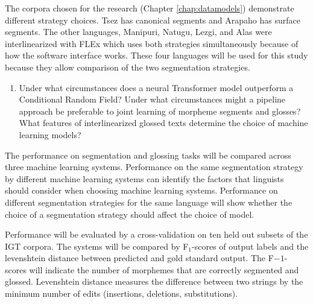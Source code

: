 
The corpora chosen for the research (Chapter \ref{chap:datamodels}) demonstrate different strategy choices.  Tsez has canonical segments and Arapaho has surface segments. The other languages, Manipuri, Natugu, Lezgi, and Alas were interlinearized with FLEx which uses both strategies simultaneously because of how the software interface works. These four languages will be used for this study because they allow comparison of the two segmentation strategies. 

\begin{enumerate}[resume]
    \item Under what circumstances does a neural Transformer model outperform a Conditional Random Field? Under what circumstances might a pipeline approach be preferable to joint learning of morpheme segments and glosses? What features of interlinearized glossed texts determine the choice of machine learning models?
\end{enumerate}

The performance on segmentation and glossing tasks will be compared across three machine learning systems.  Performance on the same segmentation strategy by different machine learning systems can identify the factors that linguists should consider when choosing machine learning systems. Performance on different segmentation strategies for the same language will show whether the choice of a segmentation strategy should affect the choice of model.  

Performance will be evaluated by a cross-validation on ten held out subsets of the IGT corpora. The systems will be compared by F$_1$-scores of output labels and the levenshtein distance between predicted and gold standard output. 
The F$-1$-scores will indicate the number of morphemes that are correctly segmented and glossed. Levenshtein distance measures the difference between two strings by the minimum number of edits (insertions, deletions, substitutions). 

